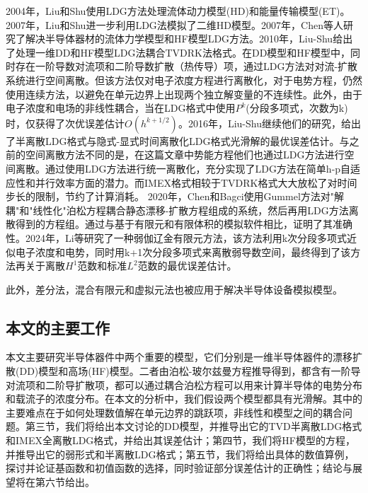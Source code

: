 2004年，Liu和Shu使用LDG方法处理流体动力模型(HD)和能量传输模型(ET)\cite{liu2004locala}。2007年，Liu和Shu进一步利用LDG法模拟了二维HD模型\cite{liu2007localb}。2007年，Chen等人研究了解决半导体器材的流体力学模型和HF模型LDG方法\cite{chen2007discontinuous}。2010年，Liu-Shu给出了处理一维DD和HF模型LDG法耦合TVDRK法格式\cite{liu2010error}。在DD模型和HF模型中，同时存在一阶导数对流项和二阶导数扩散（热传导）项，通过LDG方法对对流-扩散系统进行空间离散。但该方法仅对电子浓度方程进行离散化，对于电势方程，仍然使用连续方法，以避免在单元边界上出现两个独立解变量的不连续性。此外，由于电子浓度和电场的非线性耦合，当在LDG格式中使用$P^k$(分段多项式，次数为k)时，仅获得了次优误差估计$O(h^{k+1/2})$。2016年，Liu-Shu继续他们的研究，给出了半离散LDG格式与隐式-显式时间离散化LDG格式光滑解的最优误差估计\cite{liu2016analysis}。与之前的空间离散方法不同的是，在这篇文章中势能方程他们也通过LDG方法进行空间离散。通过使用LDG方法进行统一离散化，充分实现了LDG方法在简单h-p自适应性和并行效率方面的潜力。而IMEX格式相较于TVDRK格式大大放松了对时间步长的限制，节约了计算消耗。
2020年，Chen和Bagci使用Gummel方法对"解耦"和"线性化"泊松方程耦合静态漂移-扩散方程组成的系统，然后再用LDG方法离散得到的方程组\cite{chen2020steady}。通过与基于有限元和有限体积的模拟软件相比，证明了其准确性。2024年，Li等研究了一种弱伽辽金有限元方法，该方法利用k次分段多项式近似电子浓度和电势，同时用k+1次分段多项式来离散弱导数空间，最终得到了该方法再关于离散$H^1$范数和标准$L^2$范数的最优误差估计。

此外，差分法\cite{ding2019optimal}，混合有限元\cite{gao2018linearized}和虚拟元法\cite{liu2021virtual}也被应用于解决半导体设备模拟模型。
\subsection{本文的主要工作}
本文主要研究半导体器件中两个重要的模型，它们分别是一维半导体器件的漂移扩散(DD)模型和高场(HF)模型。二者由泊松-玻尔兹曼方程推导得到，都含有一阶导对流项和二阶导扩散项，都可以通过耦合泊松方程可以用来计算半导体的电势分布和载流子的浓度分布。在本文的分析中，我们假设两个模型都具有光滑解。其中的主要难点在于如何处理数值解在单元边界的跳跃项，非线性和模型之间的耦合问题。第三节，我们将给出本文讨论的DD模型，并推导出它的TVD半离散LDG格式和IMEX全离散LDG格式，并给出其误差估计；第四节，我们将HF模型的方程，并推导出它的弱形式和半离散LDG格式；第五节，我们将给出具体的数值算例，探讨并论证基函数和初值函数的选择，同时验证部分误差估计的正确性；结论与展望将在第六节给出。
